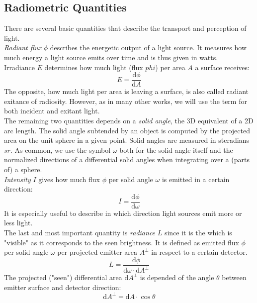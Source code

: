\documentclass[thesis.tex]{subfiles}
\begin{document}
\subsection{Radiometric Quantities}
There are several basic quantities that describe the transport and perception of light.
\\
\emph{Radiant flux} $\phi$ describes the energetic output of a light source.
It measures how much energy a light source emits over time and is thus given in watts.
\\
Irradiance $E$ determines how much light (flux $phi$) per area $A$ a surface receives:
\begin{equation}
E = \frac{\mathrm{d}\phi}{\mathrm{d}A}
\end{equation}
The opposite, how much light per area is leaving a surface, is also called radiant exitance of radiosity.
However, as in many other works, we will use the term for both incident and exitant light.
\\
The remaining two quantities depends on a \emph{solid angle}, the 3D equivalent of a 2D arc length.
The solid angle subtended by an object is computed by the projected area on the unit sphere in a given point.
Solid angles are measured in steradians $sr$.
As common, we use the symbol $\omega$ both for the solid angle itself and the normalized directions of a differential solid angles when integrating over a (parts of) a sphere.
\\
\emph{Intensity} $I$ gives how much flux $\phi$ per solid angle $\omega$ is emitted in a certain direction:
\begin{equation}
I = \frac{\mathrm{d}\phi}{\mathrm{d}\omega}
\end{equation}
It is especially useful to describe in which direction light sources emit more or less light.
\\
The last and most important quantity is \emph{radiance} $L$ since it is the which is "visible" as it corresponds to the seen brightness.
It is defined as emitted flux $\phi$ per solid angle $\omega$ per projected emitter area $A^\perp$ in respect to a certain detector.
\begin{equation}
L = \frac{\mathrm{d}\phi}{\mathrm{d}\omega \cdot \mathrm{d}A^\perp }
\end{equation}
The projected ("seen") differential area $\mathrm{d}A^\perp$ is depended of the angle $\theta$ between emitter surface and detector direction:
\begin{equation}
\mathrm{d}A^\perp = \mathrm{d}A \cdot \cos\theta
\end{equation}
\end{document}
